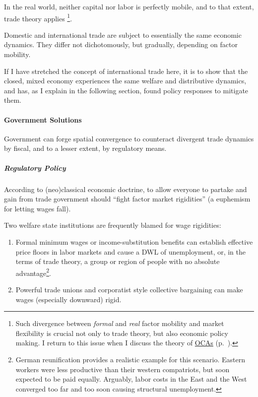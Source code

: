 In the real world, neither capital nor labor is perfectly mobile, and to that extent, trade theory applies \footnote{
	Such divergence between \emph{formal} and \emph{real} factor mobility and market flexibility is crucial not only to trade theory, but also economic policy making. I return to this issue when I discuss the theory of \hyperref[sec:OCA]{\glspl{OCA}} (p.~\pageref{sec:OCA}).}. 

Domestic and international trade are subject to essentially the same economic dynamics. They differ not dichotomously, but gradually, depending on factor mobility. 

If I have stretched the concept of international trade here, it is to show that the closed, mixed economy experiences the same welfare and distributive dynamics, and has, as I explain in the following section, found policy responses to mitigate them.

\paragraph{Government Solutions} Government can forge spatial convergence to counteract divergent trade dynamics by fiscal, and to a lesser extent, by regulatory means.

\subparagraph{Regulatory Policy} According to (neo)classical economic doctrine, to allow everyone to partake and gain from trade government should ``fight factor market rigidities'' (a euphemism for letting wages fall). 

Two welfare state institutions are frequently blamed for wage rigidities:
\begin{enumerate}
	\item Formal minimum wages or income-substitution benefits can establish effective price floors in labor markets and cause a \gls{DWL} of unemployment, or, in the terms of trade theory, a group or region of people with no absolute advantage\footnote{
		German reunification provides a realistic example for this scenario. Eastern workers were less productive than their western compatriots, but soon expected to be paid equally. Arguably, labor costs in the East and the West converged too far and too soon causing structural unemployment.}.%
	\item Powerful trade unions and corporatist style collective bargaining can make wages (especially downward) rigid.
\end{enumerate}

